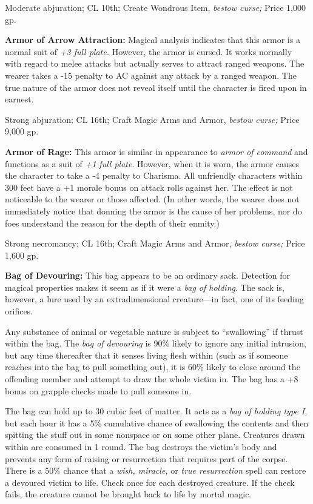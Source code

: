 Moderate abjuration; CL 10th; Create Wondrous Item, \textit{bestow curse; }Price 
1,000 gp.

\textbf{Armor of Arrow Attraction:} Magical analysis indicates that this armor 
is a normal suit of \textit{+3 full plate. }However, the armor is cursed. It works 
normally with regard to melee attacks but actually serves to attract ranged weapons. 
The wearer takes a -15 penalty to AC against any attack by a ranged weapon. The 
true nature of the armor does not reveal itself until the character is fired upon 
in earnest.

Strong abjuration; CL 16th; Craft Magic Arms and Armor, \textit{bestow curse; }Price 
9,000 gp.

\textbf{Armor of Rage: }This armor is similar in appearance to \textit{armor of 
command }and functions as a suit of \textit{+1 full plate}. However, when it is 
worn, the armor causes the character to take a -4 penalty to Charisma. All unfriendly 
characters within 300 feet have a +1 morale bonus on attack rolls against her. 
The effect is not noticeable to the wearer or those affected. (In other words, 
the wearer does not immediately notice that donning the armor is the cause of her 
problems, nor do foes understand the reason for the depth of their enmity.)

Strong necromancy; CL 16th; Craft Magic Arms and Armor, \textit{bestow curse; }Price 
1,600 gp.

\textbf{Bag of Devouring: }This bag appears to be an ordinary sack. Detection for 
magical properties makes it seem as if it were a \textit{bag of holding}. The sack 
is, however, a lure used by an extradimensional creature---in fact, one of its 
feeding orifices.

Any substance of animal or vegetable nature is subject to ``swallowing'' if thrust 
within the bag. The \textit{bag of devouring }is 90\% likely to ignore any initial 
intrusion, but any time thereafter that it senses living flesh within (such as 
if someone reaches into the bag to pull something out), it is 60\% likely to close 
around the offending member and attempt to draw the whole victim in. The bag has 
a +8 bonus on grapple checks made to pull someone in.

The bag can hold up to 30 cubic feet of matter. It acts as a \textit{bag of holding 
type I, }but each hour it has a 5\% cumulative chance of swallowing the contents 
and then spitting the stuff out in some nonspace or on some other plane. Creatures 
drawn within are consumed in 1 round. The bag destroys the victim's body and prevents 
any form of raising or resurrection that requires part of the corpse. There is 
a 50\% chance that a \textit{wish, miracle, }or \textit{true resurrection }spell 
can restore a devoured victim to life. Check once for each destroyed creature. 
If the check fails, the creature cannot be brought back to life by mortal magic.

